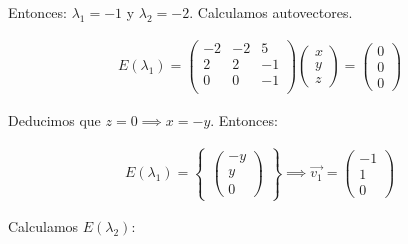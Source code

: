 \documentclass[12pt]{article}
\begin{document}
Entonces: \(\lambda_{1}= -1\) y \(\lambda_{2}=-2\).
Calculamos autovectores.

\begin{align*}
	E(\lambda_{1}) =
	\begin{pmatrix}
		-2 & -2 & 5  \\
		2  & 2  & -1 \\
		0  & 0  & -1 \\
	\end{pmatrix}
	\begin{pmatrix}
		x \\y\\z
	\end{pmatrix}
	=
	\begin{pmatrix}
		0 \\0\\0
	\end{pmatrix}
\end{align*}

Deducimos que \(z=0 \implies x=-y\). Entonces:

\begin{align*}
	E(\lambda_{1})=\begin{Bmatrix}
		               \begin{pmatrix}
			-y \\y\\0
		\end{pmatrix}
	               \end{Bmatrix}
	\implies
	\vec{v_{1}}=
	\begin{pmatrix}
		-1 \\1\\0
	\end{pmatrix}
\end{align*}

Calculamos \(E(\lambda_{2})\):
\end{document}
